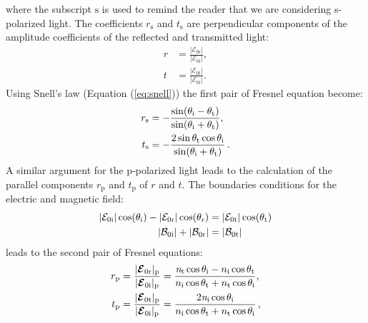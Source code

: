 where the subscript $\textrm{s}$ is used to remind the reader that we are considering s-polarized light. The coefficients $r_\textrm{s}$ and $t_\textrm{s}$ are perpendicular components of the amplitude coefficients of the reflected and transmitted light:
\begin{equation}
\begin{split}
r & =\frac{|\boldsymbol{\mathcal{E}}_{0 \textrm{r}}|}{|\boldsymbol{\mathcal{E}}_{0\textrm{i}}|}, \\
t & =\frac{|\boldsymbol{\mathcal{E}}_{0 \textrm{t}}|}{|\boldsymbol{\mathcal{E}}_{0\textrm{i}}|}.
\end{split}
\end{equation}
Using Snell's law (Equation (\ref{eq:snell})) the first pair of Fresnel equation become:
\begin{equation} \label{simple_Fresnel}
\begin{split}
r_{\textrm{s}} & = -\frac{\sin(\theta_\textrm{i}-\theta_\textrm{t})}{\sin(\theta_\textrm{i}+\theta_\textrm{t})},\\
t_{\textrm{s}} & = -\frac{2\sin \theta_\textrm{t} \cos \theta_\textrm{i}}{\sin(\theta_\textrm{i}+\theta_\textrm{t})}\,.
\end{split}
\end{equation}
\indent A similar argument for the p-polarized light leads to the calculation of the parallel components $r_\textrm{p}$ and $t_\textrm{p}$ of $r$ and $t$. 
The boundaries conditions for the electric and magnetic field:
\begin{subequations}
\begin{align}
|\mathcal{E}_{0 \textrm{i}}|\cos(\theta_{\textrm{i}}) - |\mathcal{E}_{0 \textrm{r}}|\cos(\theta_{\textrm{r}}) &= |\mathcal{E}_{0 \textrm{t}}|\cos(\theta_{\textrm{t}})\\
|\mathcal{B}_{0 \textrm{i}}| + |\mathcal{B}_{0 \textrm{r}}| &= |\mathcal{B}_{0 \textrm{t}}|
\end{align}
\end{subequations}
leads to the second pair of Fresnel equations:
\begin{equation}\label{Fresnel_parallel}
\begin{split}
r_{\textrm{p}} & = \frac{|\boldsymbol{\mathcal{E}}_{0 \textrm{r}}|_{\textrm{p}}}{|\boldsymbol{\mathcal{E}}_{0\textrm{i}}|_\textrm{p}} = \frac{\textit{n}_\textrm{t}\cos\theta_\textrm{i}-n_\textrm{i} \cos\theta_\textrm{t}}{n_\textrm{i} \cos\theta_\textrm{t}+n_\textrm{t}\cos\theta_\textrm{i}},\\
t_{\textrm{p}} & =\frac{|\boldsymbol{\mathcal{E}}_{0 \textrm{t}}|_{\textrm{p}}}{|\boldsymbol{\mathcal{E}}_{0\textrm{i}}|_\textrm{p}} =  \frac{2\textit{n}_\textrm{i}\cos\theta_\textrm{i}}{n_\textrm{i}\cos\theta_\textrm{t}+n_\textrm{t}\cos\theta_\textrm{i}}\,,
\end{split}
\end{equation}
